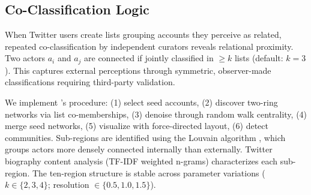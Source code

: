 \documentclass[../main.tex]{subfiles}
\begin{document}
\begin{wideblock}
\label{fig:ch6:workflow}
\end{wideblock}

\subsection{Co-Classification Logic}

When Twitter users create lists grouping accounts they perceive as related, repeated co-classification by independent curators reveals relational proximity. Two actors $a_i$ and $a_j$ are connected if jointly classified in $\geq k$ lists (default: $k = 3$). This captures external perceptions through symmetric, observer-made classifications requiring third-party validation.

We implement \textcite{benabdelkrim-opening-fields-2020}'s procedure: (1) select seed accounts, (2) discover two-ring networks via list co-memberships, (3) denoise through random walk centrality, (4) merge seed networks, (5) visualize with force-directed layout, (6) detect communities. Sub-regions are identified using the Louvain algorithm \cite{blondel2008louvain}, which groups actors more densely connected internally than externally. Twitter biography content analysis (TF-IDF weighted n-grams) characterizes each sub-region. The ten-region structure is stable across parameter variations ($k \in \{2,3,4\}$; resolution $\in \{0.5,1.0,1.5\}$).
\end{document}

